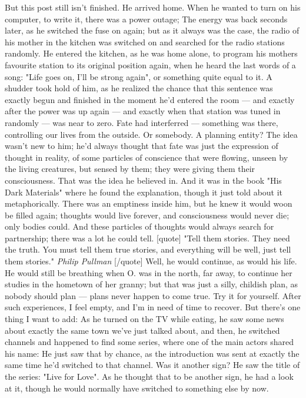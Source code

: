 But this post still isn't finished. 
He arrived home. When he wanted to turn on his computer, to write it, there was a power outage; The energy was back seconds later, as he switched the fuse on again; but as it always was the case, the radio of his mother in the kitchen was switched on and searched for the radio stations randomly. 
He entered the kitchen, as he was home alone, to program his mothers favourite station to its original position again, when he heard the last words of a song: "Life goes on, I'll be strong again", or something quite equal to it. 
A shudder took hold of him, as he realized the chance that this sentence was exactly begun and finished in the moment he'd entered the room --- and exactly after the power was up again --- and exactly when that station was tuned in randomly --- was near to zero. 
Fate had interferred --- something was there, controlling our lives from the outside. 
Or somebody. 
A planning entity?
The idea wasn't new to him; he'd always thought that fate was just the expression of thought in reality, of some particles of conscience that were flowing, unseen by the living creatures, but sensed by them; they were giving them their consciousness. 
That was the idea he believed in. 
And it was in the book "His Dark Materials" where he found the explanation, though it just told about it metaphorically. 
There was an emptiness inside him, but he knew it would woon be filled again; thoughts would live forever, and consciousness would never die; only bodies could. 
And these particles of thoughts would always search for partnership; there was a lot he could tell. 
[quote]
"Tell them stories. They need the truth. You must tell them true stories, and everything will 
be well, just tell them stories."
\emph{Philip Pullman}
[/quote]
Well, he would continue, as would his life. 
He would still be breathing when O. was in the north, far away, to continue her studies in the hometown of her granny; but that was just a silly, childish plan, as nobody should plan --- plans never happen to come true. 
Try it for yourself. 
After such experiences, I feel empty, and I'm in need of time to recover. 
But there's one thing I want to add: As he turned on the TV while eating, he saw some news about exactly the same town we've just talked about, and then, he switched channels and happened to find some series, where one of the main actors shared his name: He just saw that by chance, as the introduction was sent at exactly the same time he'd switched to that channel. 
Was it another sign?
He saw the title of the series: "Live for Love". 
As he thought that to be another sign, he had a look at it, though he would normally have switched to something else by now. 
